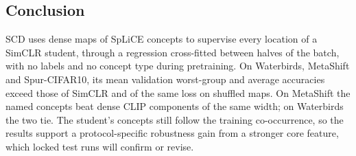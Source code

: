 \documentclass{article}
\begin{document}
\begin{samepage}
\section{Conclusion}
SCD uses dense maps of SpLiCE concepts to supervise every location of a SimCLR student, through a regression cross-fitted between halves of the batch, with no labels and no concept type during pretraining. On Waterbirds, MetaShift and Spur-CIFAR10, its mean validation worst-group and average accuracies exceed those of SimCLR and of the same loss on shuffled maps. On MetaShift the named concepts beat dense CLIP components of the same width; on Waterbirds the two tie. The student's concepts still follow the training co-occurrence, so the results support a protocol-specific robustness gain from a stronger core feature, which locked test runs will confirm or revise.
\end{samepage}
\end{document}
